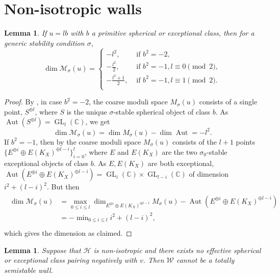 \documentclass[leqno,11pt]{amsart}
\def\C{\ensuremath{\mathbb{C}}}
\def\Aut{\mathop{\mathrm{Aut}}\nolimits}
\def\dim{\mathop{\mathrm{dim}}\nolimits}
\def\GL{\mathop{\mathrm{GL}}}
\def\min{\mathop{\mathrm{min}}\nolimits}
\newtheorem{Lem}[Thm]{Lemma}
\theoremstyle{definition}
\def\C{\ensuremath{\mathbb{C}}}
\def\HH{\ensuremath{\mathcal H}}
\def\MM{\ensuremath{\mathcal M}}
\def\WW{\ensuremath{\mathcal W}}
\begin{document}
\section{Non-isotropic walls}
\begin{Lem}\label{Lem:dimension negative}
If $u=lb$ with $b$ a primitive spherical or exceptional class, then for a generic stability condition $\sigma$, 
$$\dim\MM_{\sigma}(u)= \begin{cases}
 -l^2, & \text{ if }b^2=-2,\\

-\frac{l^2}{2}, & \text{ if }b^2=-1,l\equiv 0\pmod 2,\\

-\frac{l^2+1}{2}, & \text{ if }b^2=-1,l\equiv 1\pmod 2.\\
 \end{cases}$$
\end{Lem}
\begin{proof}
By \cite[Proposition 9.9]{Nue14b}, in case $b^2=-2$, the coarse moduli space $M_{\sigma}(u)$ consists of a single point, $S^{\oplus l}$, where $S$ is the unique $\sigma$-stable spherical object of class $b$.  As $\Aut(S^{\oplus l})=\GL_l(\C)$, we get $$\dim \MM_{\sigma}(u)=\dim M_{\sigma}(u)-\dim\Aut=-l^2.$$  If $b^2=-1$, then by \cite[Lemma 9.2]{Nue14b} the coarse moduli space $M_{\sigma}(u)$ consists of the $l+1$ points $\{E^{\oplus i}\oplus E(K_X)^{\oplus l-i}\}_{i=0}^l$, where $E$ and $E(K_X)$ are the two $\sigma_0$-stable exceptional objects of class $b$.  As $E,E(K_X)$ are both exceptional, $\Aut(E^{\oplus i}\oplus E(K_X)^{\oplus l-i})=\GL_i(\C)\times \GL_{l-i}(\C)$ of dimension $i^2+(l-i)^2$.  But then 
\begin{align}
\begin{split}\dim\MM_{\sigma}(u)&=\max_{0\leq i\leq l}\dim_{E^{\oplus i}\oplus E(K_X)^{\oplus l-i}} M_{\sigma}(u)-\Aut(E^{\oplus i}\oplus E(K_X)^{\oplus l-i})\\
&=-\min_{0\leq i\leq l} i^2+(l-i)^2,\\
\end{split}
\end{align}
which gives the dimension as claimed.
\end{proof}
\begin{Lem}\label{Lem:non-isotropic no totally semistable wall}Suppose that $\HH$ is non-isotropic and there exists no effective spherical or exceptional class pairing negatively with $v$.  Then $\WW$ cannot be a totally semistable wall.
\end{Lem}
\end{document}
